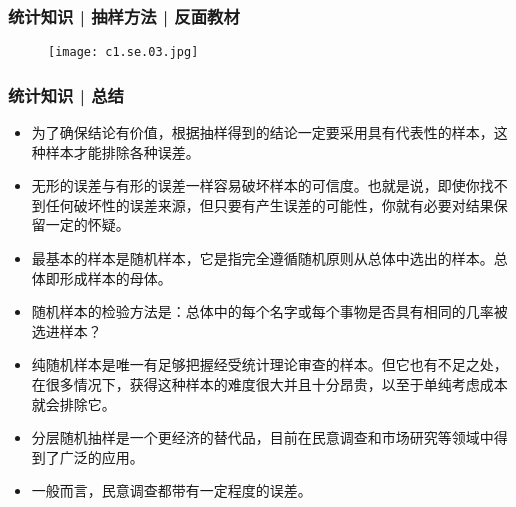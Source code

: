 \begin{frame}
  \frametitle{统计知识 | 抽样方法 | 反面教材}
  \begin{figure}
    \centering
    \texttt{[image: c1.se.03.jpg]}
  \end{figure}
\end{frame}

\begin{frame}
  \frametitle{统计知识 | 总结}
  \begin{itemize}
    \item 为了确保结论有价值，根据抽样得到的结论一定要采用具有代表性的样本，这种样本才能排除各种误差。
    \item 无形的误差与有形的误差一样容易破坏样本的可信度。也就是说，即使你找不到任何破坏性的误差来源，但只要有产生误差的可能性，你就有必要对结果保留一定的怀疑。
    \item 最基本的样本是随机样本，它是指完全遵循随机原则从总体中选出的样本。总体即形成样本的母体。 
    \item 随机样本的检验方法是：总体中的每个名字或每个事物是否具有相同的几率被选进样本？
    \item 纯随机样本是唯一有足够把握经受统计理论审查的样本。但它也有不足之处，在很多情况下，获得这种样本的难度很大并且十分昂贵，以至于单纯考虑成本就会排除它。
    \item 分层随机抽样是一个更经济的替代品，目前在民意调查和市场研究等领域中得到了广泛的应用。
    \item 一般而言，民意调查都带有一定程度的误差。
  \end{itemize}
\end{frame}




